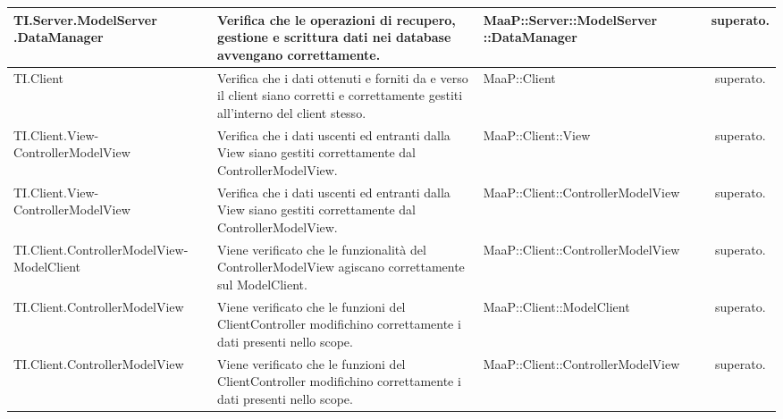\begin{center}
\begin{longtable}{|p{4.5cm}|p{3cm}|p{5.5cm}|c|}
\midrule
TI.Server.ModelServer .DataManager
& Verifica che le operazioni di recupero, gestione e scrittura dati nei database avvengano correttamente.
& MaaP::Server::ModelServer ::DataManager
& superato.\\


\midrule
TI.Client
& Verifica che i dati ottenuti e forniti da e verso il client siano corretti e correttamente gestiti all'interno del client stesso.
& MaaP::Client
& superato.\\


\midrule
TI.Client.View-ControllerModelView
& Verifica che i dati uscenti ed entranti dalla View siano gestiti correttamente dal ControllerModelView.
& MaaP::Client::View
& superato.\\


\midrule
TI.Client.View-ControllerModelView
& Verifica che i dati uscenti ed entranti dalla View siano gestiti correttamente dal ControllerModelView.
& MaaP::Client::ControllerModelView
& superato.\\


\midrule
TI.Client.ControllerModelView-ModelClient
& Viene verificato che le funzionalità del ControllerModelView agiscano correttamente sul ModelClient.
& MaaP::Client::ControllerModelView
& superato.\\


\midrule
TI.Client.ControllerModelView
& Viene verificato che le funzioni del ClientController modifichino correttamente i dati presenti nello scope.
& MaaP::Client::ModelClient
& superato.\\


\midrule
TI.Client.ControllerModelView
& Viene verificato che le funzioni del ClientController modifichino correttamente i dati presenti nello scope.
& MaaP::Client::ControllerModelView
& superato.\\


\end{longtable}
\end{center}

